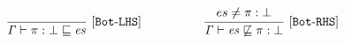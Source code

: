  \begin{gather*}
  \codeme{\frac{
\begin{matrix}
\end{matrix}
}{\text{\code{ \Gamma  \vdash \pi : \bot    \CONTAIN \es }}}\ [Bot\text{-}LHS]}
\qquad\qquad\quad
\codeme{\frac{
\begin{matrix}
\es \neq  \pi : \bot  
\end{matrix}
}{\text{\code{\Gamma  \vdash  \es \not\CONTAIN  \pi : \bot  }}} \ \codeme{  [Bot\text{-}RHS]} }
\end{gather*}
